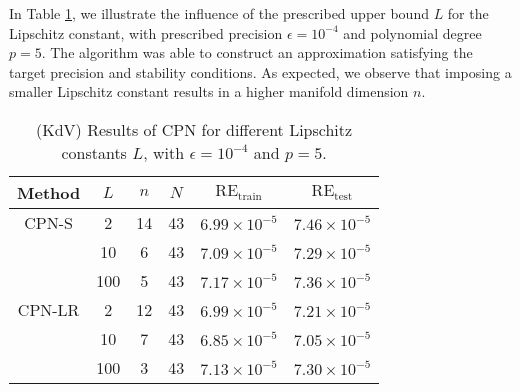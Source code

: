 In Table \ref{tab:different_L}, we illustrate the influence of the prescribed upper bound $L$ for the Lipschitz constant, with prescribed precision $\epsilon=10^{-4}$ and polynomial degree $p=5$. The algorithm was able to construct an approximation satisfying the target precision and stability conditions.   
As expected, we observe that imposing a smaller Lipschitz constant results in a higher manifold dimension $n$. 

\begin{table}[H]
\centering %

\begin{tabular}{|c|c|c|c|c|c|}
\hline
{Method} & $L$ & $n$ & $N$ & $ \text{RE}_{\text{train}} $ & $ \text{RE}_{\text{test}} $ \\ 
 \hline
\centering CPN-S & 2  & 14 & 43 & $ 6.99 \times 10^{-5}$  & $ 7.46 \times 10^{-5}$ \\ \cline{2-6}

    & 10 & 6 & 43 & $ 7.09 \times 10^{-5}$ & $ 7.29 \times 10^{-5}$ \\ \cline{2-6}

    & 100 & 5 & 43 & $ 7.17 \times 10^{-5} $ & $ 7.36 \times 10^{-5} $ \\
 \hline
 \centering CPN-LR & 2 & 12 & 43 & $6.99 \times 10^{-5}$ & $7.21 \times 10^{-5}$ \\ \cline{2-6}

    & 10 & 7 & 43 & $6.85 \times 10^{-5}$ & $7.05 \times 10^{-5}$ \\ \cline{2-6}

    & 100 & 3 & 43 & $ 7.13 \times 10^{-5}$ & $ 7.30 \times 10^{-5} $ \\
 \hline
\end{tabular}
\caption{(KdV) Results of CPN for different Lipschitz constants $L$, with $ \epsilon = 10^{-4} $ and $p=5$.}
\label{tab:different_L}
\end{table}